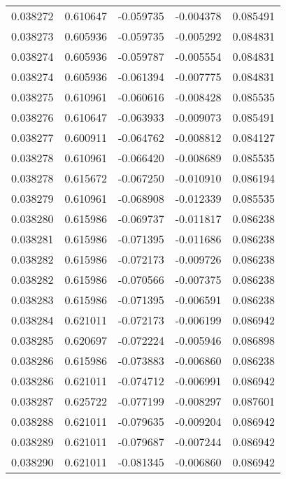\begin{tabular}{lrrrr}
0.038272    &  0.610647 & -0.059735 & -0.004378 &             0.085491 \\
0.038273    &  0.605936 & -0.059735 & -0.005292 &             0.084831 \\
0.038274    &  0.605936 & -0.059787 & -0.005554 &             0.084831 \\
0.038274    &  0.605936 & -0.061394 & -0.007775 &             0.084831 \\
0.038275    &  0.610961 & -0.060616 & -0.008428 &             0.085535 \\
0.038276    &  0.610647 & -0.063933 & -0.009073 &             0.085491 \\
0.038277    &  0.600911 & -0.064762 & -0.008812 &             0.084127 \\
0.038278    &  0.610961 & -0.066420 & -0.008689 &             0.085535 \\
0.038278    &  0.615672 & -0.067250 & -0.010910 &             0.086194 \\
0.038279    &  0.610961 & -0.068908 & -0.012339 &             0.085535 \\
0.038280    &  0.615986 & -0.069737 & -0.011817 &             0.086238 \\
0.038281    &  0.615986 & -0.071395 & -0.011686 &             0.086238 \\
0.038282    &  0.615986 & -0.072173 & -0.009726 &             0.086238 \\
0.038282    &  0.615986 & -0.070566 & -0.007375 &             0.086238 \\
0.038283    &  0.615986 & -0.071395 & -0.006591 &             0.086238 \\
0.038284    &  0.621011 & -0.072173 & -0.006199 &             0.086942 \\
0.038285    &  0.620697 & -0.072224 & -0.005946 &             0.086898 \\
0.038286    &  0.615986 & -0.073883 & -0.006860 &             0.086238 \\
0.038286    &  0.621011 & -0.074712 & -0.006991 &             0.086942 \\
0.038287    &  0.625722 & -0.077199 & -0.008297 &             0.087601 \\
0.038288    &  0.621011 & -0.079635 & -0.009204 &             0.086942 \\
0.038289    &  0.621011 & -0.079687 & -0.007244 &             0.086942 \\
0.038290    &  0.621011 & -0.081345 & -0.006860 &             0.086942 \\

\end{tabular}
